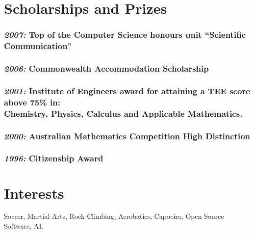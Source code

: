 \documentclass[10pt, a4paper]{report}
\begin{document}
\begin{minipage}[t]{14.5cm}
%

\section*{Scholarships and Prizes}
\subsubsection*{{\em 2007:} Top of the Computer Science honours unit ``Scientific Communication"}
\subsubsection*{{\em 2006:} Commonwealth Accommodation Scholarship}
\subsubsection*{{\em 2001:} Institute of Engineers award for attaining a TEE score above 75\% in:\\
		Chemistry, Physics, Calculus and Applicable Mathematics.}
\subsubsection*{{\em 2000:} Australian Mathematics Competition High Distinction}
\subsubsection*{{\em 1996:} Citizenship Award}

\section*{Interests}
Soccer, Martial Arts, Rock Climbing, Acrobatics, Capoeira, Open Source Software, AI.

\end{minipage}
\end{document}
